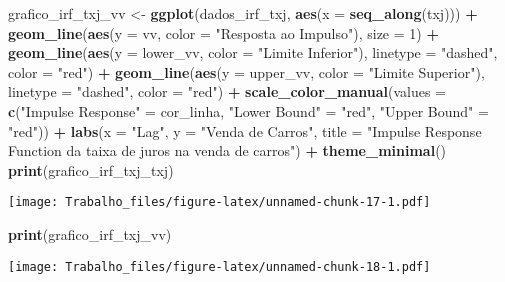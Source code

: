 \documentclass[
]{article}
\newenvironment{Shaded}{\begin{snugshade}}{\end{snugshade}}
\newcommand{\AttributeTok}[1]{\textcolor[rgb]{0.13,0.29,0.53}{#1}}
\newcommand{\DecValTok}[1]{\textcolor[rgb]{0.00,0.00,0.81}{#1}}
\newcommand{\FunctionTok}[1]{\textcolor[rgb]{0.13,0.29,0.53}{\textbf{#1}}}
\newcommand{\NormalTok}[1]{#1}
\newcommand{\OtherTok}[1]{\textcolor[rgb]{0.56,0.35,0.01}{#1}}
\newcommand{\SpecialCharTok}[1]{\textcolor[rgb]{0.81,0.36,0.00}{\textbf{#1}}}
\newcommand{\StringTok}[1]{\textcolor[rgb]{0.31,0.60,0.02}{#1}}
\begin{document}
\begin{Shaded}
\begin{Highlighting}[]
\NormalTok{grafico\_irf\_txj\_vv }\OtherTok{\textless{}{-}} \FunctionTok{ggplot}\NormalTok{(dados\_irf\_txj, }\FunctionTok{aes}\NormalTok{(}\AttributeTok{x =} \FunctionTok{seq\_along}\NormalTok{(txj))) }\SpecialCharTok{+}
  \FunctionTok{geom\_line}\NormalTok{(}\FunctionTok{aes}\NormalTok{(}\AttributeTok{y =}\NormalTok{ vv, }\AttributeTok{color =} \StringTok{"Resposta ao Impulso"}\NormalTok{), }\AttributeTok{size =} \DecValTok{1}\NormalTok{) }\SpecialCharTok{+}
  \FunctionTok{geom\_line}\NormalTok{(}\FunctionTok{aes}\NormalTok{(}\AttributeTok{y =}\NormalTok{ lower\_vv, }\AttributeTok{color =} \StringTok{"Limite Inferior"}\NormalTok{), }\AttributeTok{linetype =} \StringTok{"dashed"}\NormalTok{, }\AttributeTok{color =} \StringTok{"red"}\NormalTok{) }\SpecialCharTok{+}
  \FunctionTok{geom\_line}\NormalTok{(}\FunctionTok{aes}\NormalTok{(}\AttributeTok{y =}\NormalTok{ upper\_vv, }\AttributeTok{color =} \StringTok{"Limite Superior"}\NormalTok{), }\AttributeTok{linetype =} \StringTok{"dashed"}\NormalTok{, }\AttributeTok{color =} \StringTok{"red"}\NormalTok{) }\SpecialCharTok{+}
  \FunctionTok{scale\_color\_manual}\NormalTok{(}\AttributeTok{values =} \FunctionTok{c}\NormalTok{(}\StringTok{"Impulse Response"} \OtherTok{=}\NormalTok{ cor\_linha, }\StringTok{"Lower Bound"} \OtherTok{=} \StringTok{"red"}\NormalTok{, }\StringTok{"Upper Bound"} \OtherTok{=} \StringTok{"red"}\NormalTok{)) }\SpecialCharTok{+}
  \FunctionTok{labs}\NormalTok{(}\AttributeTok{x =} \StringTok{"Lag"}\NormalTok{, }\AttributeTok{y =} \StringTok{"Venda de Carros"}\NormalTok{, }\AttributeTok{title =} \StringTok{"Impulse Response Function da taixa de juros na venda de carros"}\NormalTok{) }\SpecialCharTok{+}
  \FunctionTok{theme\_minimal}\NormalTok{()}
\FunctionTok{print}\NormalTok{(grafico\_irf\_txj\_txj)}
\end{Highlighting}
\end{Shaded}

\texttt{[image: Trabalho\_files/figure-latex/unnamed-chunk-17-1.pdf]}

\begin{Shaded}
\begin{Highlighting}[]
\FunctionTok{print}\NormalTok{(grafico\_irf\_txj\_vv)}
\end{Highlighting}
\end{Shaded}

\texttt{[image: Trabalho\_files/figure-latex/unnamed-chunk-18-1.pdf]}
\end{document}
